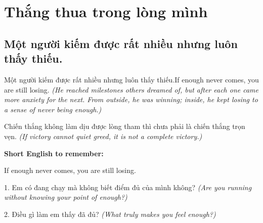 \chapter{Thắng thua trong lòng mình}

\section{Một người kiếm được rất nhiều nhưng luôn thấy thiếu.}
\begin{truyen}{Một người kiếm được rất nhiều nhưng luôn thấy thiếu.}{If enough never comes, you are still losing.}
\textit{(He reached milestones others dreamed of, but after each one came more anxiety for the next. From outside, he was winning; inside, he kept losing to a sense of never being enough.)}
\end{truyen}
\begin{baihoc}
Chiến thắng không làm dịu được lòng tham thì chưa phải là chiến thắng trọn vẹn.
\textit{(If victory cannot quiet greed, it is not a complete victory.)}
\end{baihoc}
\begin{ghinhoanh}\textbf{Short English to remember:}

If enough never comes, you are still losing.
\end{ghinhoanh}
\begin{tuhocnhanh}
1. Em có đang chạy mà không biết điểm đủ của mình không? \textit{(Are you running without knowing your point of enough?)}

2. Điều gì làm em thấy đã đủ? \textit{(What truly makes you feel enough?)}
\end{tuhocnhanh}
\ngancach

